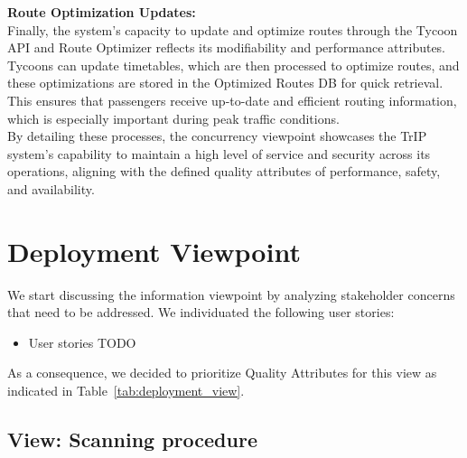 \noindent \textbf{Route Optimization Updates:} \\
Finally, the system’s capacity to update and optimize routes through the Tycoon API and Route Optimizer reflects its modifiability and performance attributes. Tycoons can update timetables, which are then processed to optimize routes, and these optimizations are stored in the Optimized Routes DB for quick retrieval. This ensures that passengers receive up-to-date and efficient routing information, which is especially important during peak traffic conditions. \\

By detailing these processes, the concurrency viewpoint showcases the TrIP system's capability to maintain a high level of service and security across its operations, aligning with the defined quality attributes of performance, safety, and availability.
\section{Deployment Viewpoint}
We start discussing the information viewpoint by analyzing stakeholder concerns that need to be addressed.
We individuated the following user stories:
\begin{itemize}
    \item User stories TODO
\end{itemize}

As a consequence, we decided to prioritize Quality Attributes for this view as indicated in Table~\ref{tab:deployment_view}.
\begin{table}[h!]
    \centering
    \caption{Deployment View Prioritized Quality Attributes}
    \label{tab:deployment_view}
\end{table}

\subsection{View: Scanning procedure}
